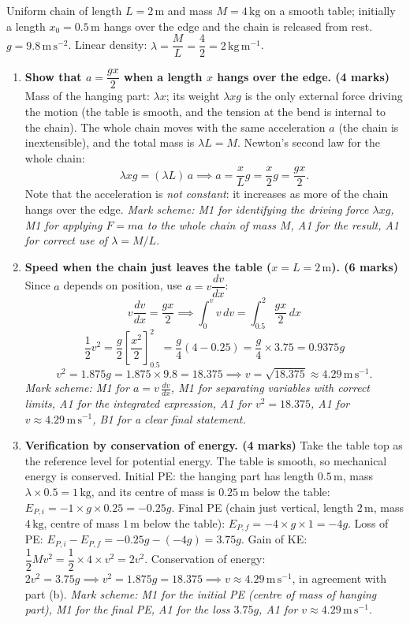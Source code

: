 \documentclass[11pt]{article}
\begin{document}
\begin{corrige}
Uniform chain of length $L = 2\,\mathrm{m}$ and mass $M = 4\,\mathrm{kg}$ on a smooth table; initially a length $x_0 = 0.5\,\mathrm{m}$ hangs over the edge and the chain is released from rest. $g = 9.8\,\mathrm{m\,s^{-2}}$.
Linear density: $\lambda = \dfrac{M}{L} = \dfrac{4}{2} = 2\,\mathrm{kg\,m^{-1}}$.
\begin{enumerate}
\item[(a)] \textbf{Show that $a = \dfrac{gx}{2}$ when a length $x$ hangs over the edge. (4 marks)}
Mass of the hanging part: $\lambda x$; its weight $\lambda x g$ is the only external force driving the motion (the table is smooth, and the tension at the bend is internal to the chain).
The whole chain moves with the same acceleration $a$ (the chain is inextensible), and the total mass is $\lambda L = M$.
Newton's second law for the whole chain:
\[\lambda x g = (\lambda L)\,a \implies a = \frac{x}{L}g = \frac{x}{2}g = \frac{gx}{2}.\]
Note that the acceleration is \emph{not constant}: it increases as more of the chain hangs over the edge.
\textit{Mark scheme: M1 for identifying the driving force $\lambda x g$, M1 for applying $F = ma$ to the whole chain of mass $M$, A1 for the result, A1 for correct use of $\lambda = M/L$.}
\item[(b)] \textbf{Speed when the chain just leaves the table ($x = L = 2\,\mathrm{m}$). (6 marks)}
Since $a$ depends on position, use $a = v\dfrac{dv}{dx}$:
\[v\frac{dv}{dx} = \frac{gx}{2} \implies \int_0^v v\,dv = \int_{0.5}^{2} \frac{gx}{2}\,dx\]
\[\frac{1}{2}v^2 = \frac{g}{2}\left[\frac{x^2}{2}\right]_{0.5}^{2} = \frac{g}{4}\left(4 - 0.25\right) = \frac{g}{4}\times 3.75 = 0.9375g\]
\[v^2 = 1.875g = 1.875\times 9.8 = 18.375 \implies v = \sqrt{18.375} \approx 4.29\,\mathrm{m\,s^{-1}}.\]
\textit{Mark scheme: M1 for $a = v\,\frac{dv}{dx}$, M1 for separating variables with correct limits, A1 for the integrated expression, A1 for $v^2 = 18.375$, A1 for $v \approx 4.29\,\mathrm{m\,s^{-1}}$, B1 for a clear final statement.}
\item[(c)] \textbf{Verification by conservation of energy. (4 marks)}
Take the table top as the reference level for potential energy. The table is smooth, so mechanical energy is conserved.
Initial PE: the hanging part has length $0.5\,\mathrm{m}$, mass $\lambda\times 0.5 = 1\,\mathrm{kg}$, and its centre of mass is $0.25\,\mathrm{m}$ below the table:
$E_{P,i} = -1\times g\times 0.25 = -0.25g$.
Final PE (chain just vertical, length $2\,\mathrm{m}$, mass $4\,\mathrm{kg}$, centre of mass $1\,\mathrm{m}$ below the table):
$E_{P,f} = -4\times g\times 1 = -4g$.
Loss of PE: $E_{P,i} - E_{P,f} = -0.25g - (-4g) = 3.75g$.
Gain of KE: $\dfrac{1}{2}Mv^2 = \dfrac{1}{2}\times 4\times v^2 = 2v^2$.
Conservation of energy: $2v^2 = 3.75g \implies v^2 = 1.875g = 18.375 \implies v \approx 4.29\,\mathrm{m\,s^{-1}}$, in agreement with part (b).
\textit{Mark scheme: M1 for the initial PE (centre of mass of hanging part), M1 for the final PE, A1 for the loss $3.75g$, A1 for $v \approx 4.29\,\mathrm{m\,s^{-1}}$.}
\end{enumerate}
\end{corrige}
\end{document}
